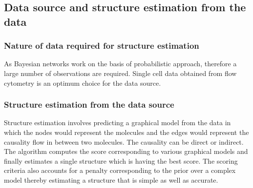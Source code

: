 \documentclass[conference]{IEEEtran}
\begin{document}
\subsection{Data source and structure estimation from the data}
\subsubsection{Nature of data required for structure estimation}
As Bayesian networks work on the basis of probabilistic approach, therefore a large number of observations are required. Single cell data obtained from  flow cytometry is an optimum choice for the data source.

\subsubsection{Structure estimation from the data source}
Structure estimation involves predicting a graphical model from the data in which the nodes would represent the molecules and the edges would represent the causality flow in between two molecules. The causality can be direct or indirect. The algorithm computes the score corresponding to various graphical models and finally estimates a single structure which is having the best score. The scoring criteria also accounts for a penalty corresponding to the prior over a complex model thereby estimating a structure that is simple as well as accurate.
\end{document}
